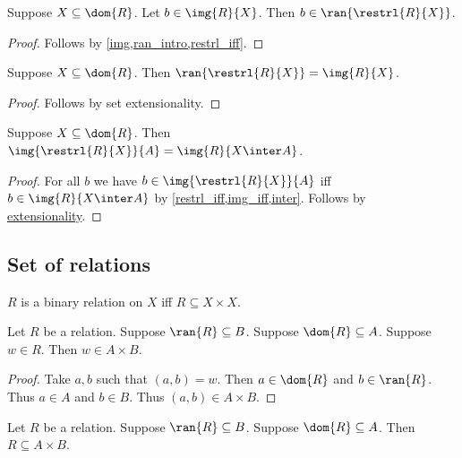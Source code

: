 \begin{proposition}\label{restrl_ran_intro}
    Suppose $X\subseteq\dom{R}$.
    Let $b\in\img{R}{X}$.
    Then $b\in\ran{\restrl{R}{X}}$.
\end{proposition}
\begin{proof}
    Follows by \cref{img,ran_intro,restrl_iff}.
\end{proof}

\begin{proposition}\label{restrl_ran}
    Suppose $X\subseteq\dom{R}$.
    Then $\ran{\restrl{R}{X}} = \img{R}{X}$.
\end{proposition}
\begin{proof}
    Follows by set extensionality.
\end{proof}

\begin{proposition}\label{restrl_img}
    Suppose $X\subseteq\dom{R}$.
    Then $\img{\restrl{R}{X}}{A} = \img{R}{X\inter A}$.
\end{proposition}
\begin{proof}
    For all $b$ we have $b\in\img{\restrl{R}{X}}{A}$ iff $b\in \img{R}{X\inter A}$
        by \cref{restrl_iff,img_iff,inter}.
    Follows by \hyperref[setext]{extensionality}.
\end{proof}



\subsection{Set of relations}

\begin{abbreviation}\label{binary_relation_on}
    $R$ is a binary relation on $X$ iff $R\subseteq X\times X$.
\end{abbreviation}

\begin{proposition}\label{relation_subseteq_intro_elem}
    Let $R$ be a relation.
    Suppose $\ran{R}\subseteq B$.
    Suppose $\dom{R}\subseteq A$.
    Suppose $w\in R$.
    Then $w\in A\times B$.
\end{proposition}
\begin{proof}
    Take $a, b$ such that $(a, b) = w$.
    Then $a\in\dom{R}$ and $b\in\ran{R}$.
    Thus $a\in A$ and $b\in B$.
    Thus $(a, b)\in A\times B$.
\end{proof}

\begin{proposition}\label{relation_subseteq_intro}
    Let $R$ be a relation.
    Suppose $\ran{R}\subseteq B$.
    Suppose $\dom{R}\subseteq A$.
    Then $R\subseteq A\times B$.
\end{proposition}

